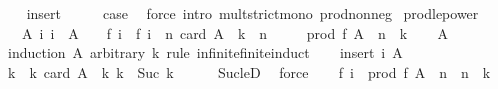 \begin{isabellebody}
\isamarkupfalse%
\isanewline
\ \ \isamarkupfalse%
\ insert\isanewline
\ \ \isamarkupfalse%
\ \isamarkupfalse%
\ {\isacharquery}{\kern0pt}case\ \isamarkupfalse%
\ {\isacharparenleft}{\kern0pt}force\ intro{\isacharcolon}{\kern0pt}\ mult{\isacharunderscore}{\kern0pt}strict{\isacharunderscore}{\kern0pt}mono{\isacharprime}{\kern0pt}\ prod{\isacharunderscore}{\kern0pt}nonneg{\isacharparenright}{\kern0pt}\isanewline
{}\isamarkupfalse%
%
\endisatagproof
{\isafoldproof}%
%
\isadelimproof
\isanewline
%
\endisadelimproof
\isanewline
{}\isamarkupfalse%
\ prod{\isacharunderscore}{\kern0pt}le{\isacharunderscore}{\kern0pt}power{\isacharcolon}{\kern0pt}\isanewline
\ \ \ A{\isacharcolon}{\kern0pt}\ {\isachardoublequoteopen}{\isasymAnd}i{\isachardot}{\kern0pt}\ i\ {\isasymin}\ A\ {\isasymLongrightarrow}\ {}\ {\isasymle}\ f\ i\ {\isasymand}\ f\ i\ {\isasymle}\ n{\isachardoublequoteclose}\ {\isachardoublequoteopen}card\ A\ {\isasymle}\ k{\isachardoublequoteclose}\ \ {\isachardoublequoteopen}n\ {\isasymge}\ {}{\isachardoublequoteclose}\isanewline
\ \ \ {\isachardoublequoteopen}prod\ f\ A\ {\isasymle}\ n\ {\isacharcircum}{\kern0pt}\ k{\isachardoublequoteclose}\isanewline
%
\isadelimproof
\ \ %
\endisadelimproof
%
\isatagproof
{}\isamarkupfalse%
\ A\isanewline
{}\isamarkupfalse%
\ {\isacharparenleft}{\kern0pt}induction\ A\ arbitrary{\isacharcolon}{\kern0pt}\ k\ rule{\isacharcolon}{\kern0pt}\ infinite{\isacharunderscore}{\kern0pt}finite{\isacharunderscore}{\kern0pt}induct{\isacharparenright}{\kern0pt}\isanewline
\ \ \isamarkupfalse%
\ {\isacharparenleft}{\kern0pt}insert\ i\ A{\isacharparenright}{\kern0pt}\isanewline
\ \ \isamarkupfalse%
\ \isamarkupfalse%
\ k{\isacharprime}{\kern0pt}\ \ k{\isacharprime}{\kern0pt}{\isacharcolon}{\kern0pt}\ {\isachardoublequoteopen}card\ A\ {\isasymle}\ k{\isacharprime}{\kern0pt}{\isachardoublequoteclose}\ {\isachardoublequoteopen}k\ {\isacharequal}{\kern0pt}\ Suc\ k{\isacharprime}{\kern0pt}{\isachardoublequoteclose}\isanewline
\ \ \ \ \isamarkupfalse%
\ Suc{\isacharunderscore}{\kern0pt}le{\isacharunderscore}{\kern0pt}D\ \isamarkupfalse%
\ force\isanewline
\ \ \isamarkupfalse%
\ {\isachardoublequoteopen}f\ i\ {\isacharasterisk}{\kern0pt}\ prod\ f\ A\ {\isasymle}\ n\ {\isacharasterisk}{\kern0pt}\ n\ {\isacharcircum}{\kern0pt}\ k{\isacharprime}{\kern0pt}{\isachardoublequoteclose}\isanewline

\end{isabellebody}
